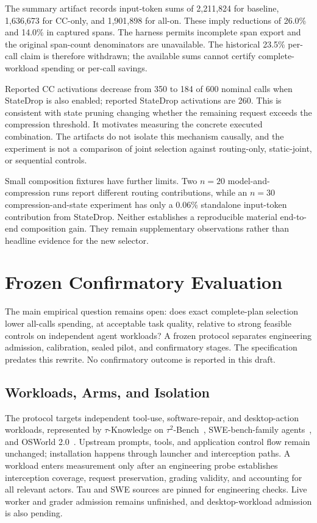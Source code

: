 The summary artifact records input-token sums of 2,211,824 for baseline,
1,636,673 for CC-only, and 1,901,898 for all-on. These imply reductions of 26.0\%
and 14.0\% in captured spans. The harness permits incomplete span export and the
original span-count denominators are unavailable. The historical 23.5\% per-call
claim is therefore withdrawn; the available sums cannot certify complete-workload
spending or per-call savings.

Reported CC activations decrease from 350 to 184 of 600 nominal calls when StateDrop
is also enabled; reported StateDrop activations are 260. This is consistent with
state pruning changing whether the remaining request exceeds the compression
threshold. It motivates measuring the concrete executed combination. The artifacts
do not isolate this mechanism causally, and the experiment is not a comparison of
joint selection against routing-only, static-joint, or sequential controls.

Small composition fixtures have further limits. Two $n=20$ model-and-compression
runs report different routing contributions, while an $n=30$ compression-and-state
experiment has only a 0.06\% standalone input-token contribution from StateDrop.
Neither establishes a reproducible material end-to-end composition gain. They remain
supplementary observations rather than headline evidence for the new selector.

\section{Frozen Confirmatory Evaluation}
\label{sec:methodology}

The main empirical question remains open: does exact complete-plan selection lower
all-calls spending, at acceptable task quality, relative to strong feasible controls
on independent agent workloads? A frozen protocol separates engineering admission,
calibration, sealed pilot, and confirmatory stages. The specification predates this
rewrite. No confirmatory outcome is reported in this draft.

\subsection{Workloads, Arms, and Isolation}

The protocol targets independent tool-use, software-repair, and desktop-action
workloads, represented by $\tau$-Knowledge on $\tau^2$-Bench~\cite{shi2026tauknowledge,barres2026tau2},
SWE-bench-family agents~\cite{jimenez2024swebench,badertdinov2025swerebench}, and
OSWorld 2.0~\cite{yuan2026osworld2}. Upstream prompts, tools, and application control flow remain unchanged;
installation happens through launcher and interception paths. A workload enters
measurement only after an engineering probe establishes interception coverage,
request preservation, grading validity, and accounting for all relevant actors.
Tau and SWE sources are pinned for engineering checks. Live worker and grader
admission remains unfinished, and desktop-workload admission is also pending.

